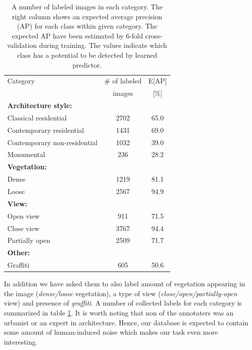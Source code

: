 \documentclass[runningheads, table]{llncs}
\begin{document}
  \begin{table}[t]
  \centering
    \begin{tabular}{|lcc|}
      \hline
      Category        &     $\#$ of labeled         & \hspace{3mm} E[AP]    \\
                      &     \hspace{3mm} images     & \hspace{3mm} [$\%$]     \\
      \hline
      \hline
      \textbf{Architecture style:} & &\\
        Classical residential           & 2702 & 65.0 \\
        Contemporary residential        & 1431 & 69.0 \\
        Contemporary non-residential    & 1032 & 39.0 \\
        Monumental                      & 236  & 28.2 \\
      \hline
      \textbf{Vegetation:}  & &\\
        Dense               & 1219 & 81.1 \\
        Loose               & 2567 & 94.9 \\
      \hline
      \textbf{View:} & &\\
        Open view           & 911  & 71.5 \\
        Close view          & 3767 & 94.4 \\
        Partially open      & 2509 & 71.7 \\
      \hline
      \textbf{Other:} & &\\
        Graffiti           & 605 & 50.6 \\
      \hline
    \end{tabular}
    \vspace{3mm}
    \caption{
              A number of labeled images in each category. The right column shows an expected average precision (AP) for each class within given category. The expected AP have been estimated by 6-fold cross-validation during training. The values indicate which class has a potential to be detected by learned predictor.
            } 
    \label{tab:categories}
  \end{table}

  In addition we have asked them to also label amount of vegetation appearing in the image (\emph{dense/loose} vegetation), a type of view (\emph{close/open/partially-open} view) and presence of \emph{graffiti}. A number of collected labels for each category is summarized in table \ref{tab:categories}. It is worth noting that non of the annotaters was an urbanist or an expert in architecture. Hence, our database is expected to contain some amount of human-induced noise which makes our task even more interesting.
\end{document}
